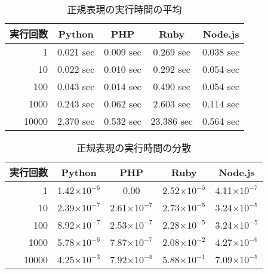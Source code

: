 \begin{table}[tbp]
\centering
\caption{正規表現の実行時間の平均}
\label{table:s-average}
\begin{tabular}{|r||c|c|c|c|}
\hline
実行回数	&Python	&PHP	&Ruby	&Node.js\\ \hline \hline
1	    &0.021 sec	&0.009 sec	&0.269 sec	&0.038 sec\\ \hline
10	    &0.022 sec	&0.010 sec	&0.292 sec	&0.054 sec\\ \hline
100	    &0.043 sec	&0.014 sec	&0.490 sec	&0.054 sec\\ \hline
1000	&0.243 sec	&0.062 sec	&2.603 sec	&0.114 sec\\ \hline
10000	&2.370 sec	&0.532 sec	&23.386 sec	&0.564 sec\\ \hline
\end{tabular}
\end{table}

\begin{table}[tbp]
\centering
\caption{正規表現の実行時間の分散}
\label{table:s-dispersion}
\begin{tabular}{|r||c|c|c|c|}
\hline
実行回数	&Python	&PHP	&Ruby	&Node.js\\ \hline \hline
1	    &1.42$\times 10^{-6}$	&0.00               	&2.52$\times 10^{-5}$	&4.11$\times 10^{-7}$\\ \hline
10	    &2.39$\times 10^{-7}$	&2.61$\times 10^{-7}$	&2.73$\times 10^{-5}$	&3.24$\times 10^{-5}$\\ \hline
100	    &8.92$\times 10^{-7}$	&2.53$\times 10^{-7}$	&2.28$\times 10^{-5}$	&3.24$\times 10^{-5}$\\ \hline
1000	&5.78$\times 10^{-6}$	&7.87$\times 10^{-7}$	&2.08$\times 10^{-2}$	&4.27$\times 10^{-6}$\\ \hline
10000	&4.25$\times 10^{-3}$	&7.92$\times 10^{-5}$	&5.88$\times 10^{-1}$	&7.09$\times 10^{-5}$\\ \hline
\end{tabular}
\end{table}
